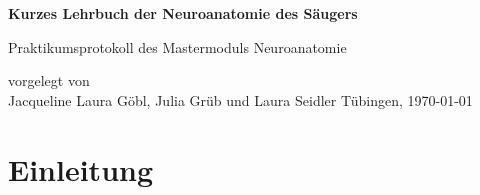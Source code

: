 \documentclass[12pt,a4paper,pdftex]{article}
\begin{document}
\setlength{\parindent}{0pt}


\begin{titlepage}
 \begin{center}
        \vspace*{1cm}
        \LARGE
        \textbf{Kurzes Lehrbuch der Neuroanatomie des Säugers}
        \vspace{2cm}
        
        \Large
        Praktikumsprotokoll des Mastermoduls Neuroanatomie
        \vspace{4cm}
        
        \large
        vorgelegt von \\ Jacqueline Laura Göbl, Julia Grüb und Laura Seidler %
        \vfill
        \large     
        T\"ubingen, \today
    \end{center}
    \newpage
        \thispagestyle{empty}
        \mbox{}
        \newpage
\end{titlepage}


\thispagestyle{empty}
\mbox{}


\tableofcontents
\newpage
\listoffigures
\listoftables



\newpage
\section{Einleitung}
\end{document}
